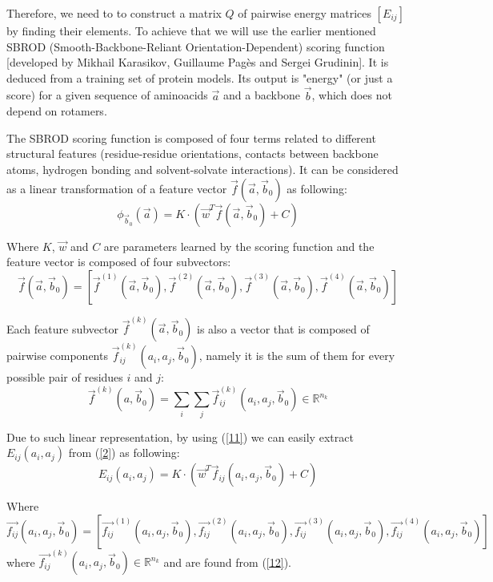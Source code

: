 \documentclass[12pt,twoside]{article}
\begin{document}
Therefore, we need to to construct a matrix $Q$ of pairwise energy matrices $[E_{ij}]$ by finding their elements.
\newline
To achieve that we will use the earlier mentioned SBROD (Smooth-Backbone-Reliant Orientation-Dependent) scoring function [developed by Mikhail Karasikov, Guillaume Pagès and Sergei Grudinin]. It is deduced
from a training set of protein models. Its output is "energy" (or just a score) for a given sequence of aminoacids $\vec{a}$ and a backbone $\vec{b}$, which does not depend on rotamers.

The SBROD scoring function is composed of four terms related to
different structural features (residue-residue orientations, contacts between backbone atoms, hydrogen
bonding and solvent-solvate interactions). It can be considered as a linear transformation of a feature vector $\vec{f}(\vec{a},\vec{b}_0)$ as following:
\begin{equation}
\label{11}
\phi_{\vec{b}_0}(\vec{a})
=K\cdot(\vec{w}^T \vec{f}(\vec{a},\vec{b}_0)+C)
\end{equation}

Where   $K$, $\vec{w}$ and $C$ are parameters learned by the scoring function and the feature vector is composed of four subvectors: 
$$
\vec{f}(\vec{a},\vec{b}_0)
=[\vec{f}^{(1)}(\vec{a},\vec{b}_0),
\vec{f}^{(2)}(\vec{a},\vec{b}_0),
\vec{f}^{(3)}(\vec{a},\vec{b}_0),
\vec{f}^{(4)}(\vec{a},\vec{b}_0)]
$$

Each feature subvector $\vec{f}^{(k)}(\vec{a},\vec{b}_0)$ is also a vector that is composed of pairwise components $\vec{f}^{(k)}_{ij}(a_i,a_j,\vec{b}_0)$, namely it is the sum of them for every possible pair of residues $i$ and  $j$:
\begin{equation}
\label{12}
\vec{f}^{(k)}(a,\vec{b}_0)
=\sum_i\sum_j \vec{f}^{(k)}_{ij}(a_i,a_j,\vec{b}_0)\in\mathbb{R}^{n_k}
\end{equation}

Due to such linear representation, by using (\ref{11}) we can easily extract $E_{ij}(a_i,a_j)$ from (\ref{2}) as following:
\begin{equation}
\label{13}
E_{ij}(a_i,a_j) = K\cdot(\vec{w}^T \vec{f}_{ij}(a_i, a_j,\vec{b}_0)+C)
\end{equation}

Where
$$
\vec{f_{ij}}(a_i, a_j,\vec{b}_0)
=[\vec{f_{ij}}^{(1)}(a_i, a_j,\vec{b}_0),
\vec{f_{ij}}^{(2)}(a_i, a_j,\vec{b}_0),
\vec{f_{ij}}^{(3)}(a_i, a_j,\vec{b}_0),
\vec{f_{ij}}^{(4)}(a_i, a_j,\vec{b}_0)]
$$
where $\vec{f_{ij}}^{(k)}(a_i, a_j,\vec{b}_0)\in\mathbb{R}^{n_k}$ and are found from (\ref{12}).
\end{document}

